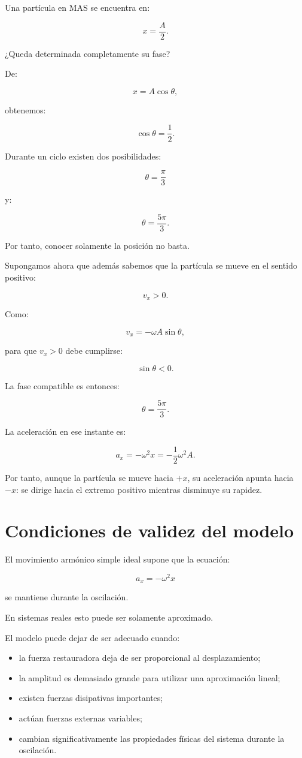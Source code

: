 \begin{ejemplo}
Una partícula en MAS se encuentra en:

\[ x=\frac{A}{2}. \]

¿Queda determinada completamente su fase?

De:

\[ x=A\cos\theta, \]

obtenemos:

\[ \cos\theta=\frac{1}{2}. \]

Durante un ciclo existen dos posibilidades:

\[ \theta=\frac{\pi}{3} \]

y:

\[ \theta=\frac{5\pi}{3}. \]

Por tanto, conocer solamente la posición no basta.

Supongamos ahora que además sabemos que la partícula se mueve en el sentido positivo:

\[ v_x>0. \]

Como:

\[ v_x=-\omega A\sin\theta, \]

para que \(v_x>0\) debe cumplirse:

\[ \sin\theta<0. \]

La fase compatible es entonces:

\[ \boxed{\theta=\frac{5\pi}{3}}. \]

La aceleración en ese instante es:

\[ a_x=-\omega^2x=-\frac{1}{2}\omega^2A. \]

Por tanto, aunque la partícula se mueve hacia \(+x\), su aceleración apunta hacia \(-x\): se dirige hacia el extremo positivo mientras disminuye su rapidez.
\end{ejemplo}

\section{Condiciones de validez del modelo}

El movimiento armónico simple ideal supone que la ecuación:

\[ a_x=-\omega^2x \]

se mantiene durante la oscilación.

En sistemas reales esto puede ser solamente aproximado.

El modelo puede dejar de ser adecuado cuando:

\begin{itemize}
    \item la fuerza restauradora deja de ser proporcional al desplazamiento;
    \item la amplitud es demasiado grande para utilizar una aproximación lineal;
    \item existen fuerzas disipativas importantes;
    \item actúan fuerzas externas variables;
    \item cambian significativamente las propiedades físicas del sistema durante la oscilación.
\end{itemize}

